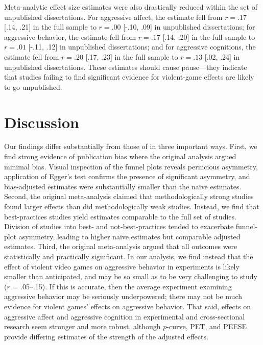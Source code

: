 \documentclass[man, mask]{apa6}
\begin{document}
Meta-analytic effect size estimates were also drastically reduced within the set of unpublished dissertations. For aggressive affect, the estimate fell from $r = .17$ [.14, .21] in the full sample to $r = .00$ [-.10, .09] in unpublished dissertations; for aggressive behavior, the estimate fell from $r = .17$ [.14, .20] in the full sample to $r = .01$ [-.11, .12] in unpublished dissertations; and for aggressive cognitions, the estimate fell from $r = .20$ [.17, .23] in the full sample to $r =  .13$ [.02, .24] in unpublished dissertations.  These estimates should cause pause---they indicate that studies failing to find significant evidence for violent-game effects are likely to go unpublished.

\section{Discussion}
Our findings differ substantially from those of \citet{Anderson:etal:2010} in three important ways. First, we find strong evidence of publication bias where the original analysis argued minimal bias. Visual inspection of the funnel plots reveals pernicious asymmetry, application of Egger's test confirms the presence of significant asymmetry, and bias-adjusted estimates were substantially smaller than the na{\"i}ve estimates. Second, the original meta-analysis claimed that methodologically strong studies found larger effects than did methodologically weak studies. Instead, we find that best-practices studies yield estimates comparable to the full set of studies. Division of studies into best- and not-best-practices tended to exacerbate funnel-plot asymmetry, leading to higher na{\"i}ve estimates but comparable adjusted estimates.  
Third, the original meta-analysis argued that all outcomes were statistically and practically significant. In our analysis, we find instead that the effect of violent video games on aggressive behavior in experiments is likely smaller than anticipated, and may be so small as to be very challenging to study ($r$ = .05--.15). If this is accurate, then the average experiment examining aggressive behavior may be seriously underpowered; there may not be much evidence for violent games' effects on aggressive behavior. That said, effects on aggressive affect and aggressive cognition in experimental and cross-sectional research seem stronger and more robust, although $p$-curve, PET, and PEESE provide differing estimates of the strength of the adjusted effects.
 
\end{document}
